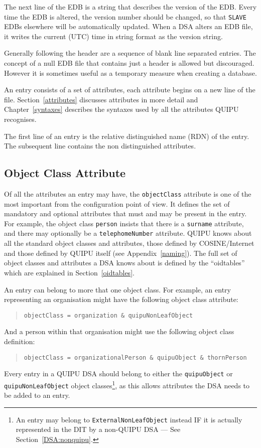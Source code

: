 The next line of the EDB 
is a string that describes the version of the EDB. Every
time the EDB is altered, the version number
should be changed, so that
\verb"SLAVE" EDBs elsewhere will be automatically updated.
When a DSA alters an EDB file, it writes the current (UTC) time in string
format as the version string.

Generally following the header are a sequence of blank line separated
entries.  The concept of a null EDB file that contains just a
header is allowed but discouraged.  However it is sometimes useful as
a temporary measure when creating a database.

An entry consists of a set of attributes, each attribute begins on a
new line of the file.
Section~\ref{attributes} discusses attributes in more detail and
Chapter~\ref{syntaxes} describes the syntaxes used by all the
attributes QUIPU recognises.

The first line of an entry is the relative distinguished name
 (RDN) of the entry.
The subsequent line contains the non distinguished attributes.


\subsection{Object Class Attribute}
Of all the attributes an entry may have, the \verb+objectClass+
attribute is one of the most important from the configuration point of view.
It defines the set of mandatory and optional attributes that must and may be
present in the entry.
For example, the object class \verb+person+ insists that there is a \verb+surname+
attribute, and there may optionally be a \verb+telephomeNumber+ attribute.
QUIPU knows about all the standard object classes and attributes, 
those defined by COSINE/Internet \cite{Cosine.NA} and
those defined by QUIPU itself (see Appendix~\ref{naming}).
The full set of object classes and attributes a DSA knows about is
defined by the ``oidtables'' which are explained in Section~\ref{oidtables}.

An entry can belong to more that one object class.
For example, an entry representing an organisation might have the following
object class attribute:
\begin{quote}\small\begin{verbatim}
objectClass = organization & quipuNonLeafObject
\end{verbatim}\end{quote}
And a person within that organisation might use the following object class
definition:
\begin{quote}\small\begin{verbatim}
objectClass = organizationalPerson & quipuObject & thornPerson
\end{verbatim}\end{quote}
Every entry in a QUIPU DSA should belong to either the \verb"quipuObject"
or 
\verb"quipuNonLeafObject" object classes\footnote{An
entry may belong to \verb"ExternalNonLeafObject" instead IF it is
actually represented in the DIT by a non-QUIPU DSA  --- See
Section~\ref{DSA:nonquipu}.}, as this allows
attributes the DSA needs to be added to an entry.

